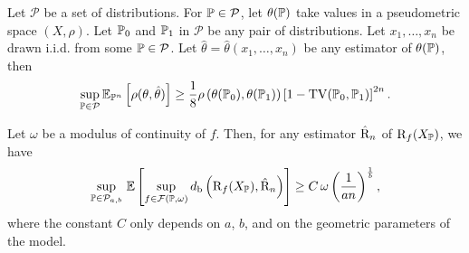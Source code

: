 \begin{lem}[Le Cam] \label{Lem:Lecam} Let $\mathcal P $ be a set of distributions. For $\mathbb{P} \in  \mathcal P$, 
let $\theta(\mathbb{P})$ take values in a pseudometric space $(X,\rho)$. 
Let $\mathbb{P}_0$ and $\mathbb{P}_1$ in $\mathcal P$ be any pair of distributions. Let $x_1,\dots,x_n$ be drawn i.i.d. from some $\mathbb{P} \in  \mathcal P$. Let $\hat 
\theta = \hat \theta(x_1,\dots,x_n) $ be any estimator of $\theta(\mathbb{P})$, then
\begin{equation*}
 \sup_{ \mathbb{P} \in \mathcal P} \mathbb{E} _{\mathbb{P}^n} \left[ \rho( \theta , \hat \theta  )\right]  \geq   \frac 1 8    \rho \left( \theta(\mathbb{P}_0), \theta(\mathbb{P}_1) \right)   
\left[1 -  \operatorname{TV}(\mathbb{P}_0,\mathbb{P}_1) \right] ^{2 n } .
\end{equation*}
\end{lem}


\begin{prop}\label{prop:lecam}
Let  $\omega$ be a  modulus of continuity of $f$. Then, for any estimator ${\hat {\mathrm{R}}}_n$  of  $\mathrm{R}_f(X_{\mathbb{P}})$, %
we have
\begin{equation*}
\underset{\mathbb{P} \in\mathcal{P}_{a,b}}{\rm sup}\  \mathbb{E} \left[   \sup_{f \in \mathcal F(\mathbb{P},\omega) }  d_{\rm b}\left( 
\mathrm{R}_f(X_{\mathbb{P}}),{\hat {\mathrm{R}}}_n \right)
\right]
\geq 
 C\,\omega\left(\frac{1}{an}\right)^{\frac 1{b}}, 
 \end{equation*}
where the constant $C$ only depends on $a$, $b$, and on the geometric parameters of the model.
\end{prop}

